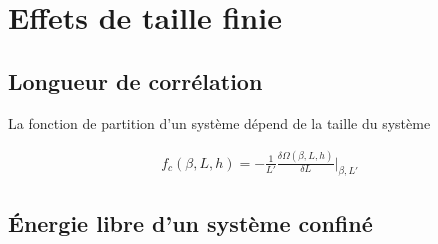 \chapter{Effets de taille finie}
    \label{chap-sos}
	
\section{Longueur de corrélation}

La fonction de partition d'un système dépend de la taille du système 
	
\begin{align}
    f_c(\beta,L,h) = - \frac{1}{L'} \frac{\delta \Omega(\beta,L,h)}{\delta L} \bigg|_{\beta,L'}
    \label{casimir-interface}
\end{align}
	
	
    \section{Énergie libre d'un système confiné}
	
